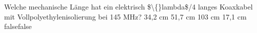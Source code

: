     {Welche mechanische Länge hat ein elektrisch \$\textbackslash\{\}lambda\$/4 langes Koaxkabel mit Vollpolyethylenisolierung bei 145 MHz?}
    {34,2 cm}
    {51,7 cm}
    {103 cm}
    {17,1 cm}
    {false}{false}